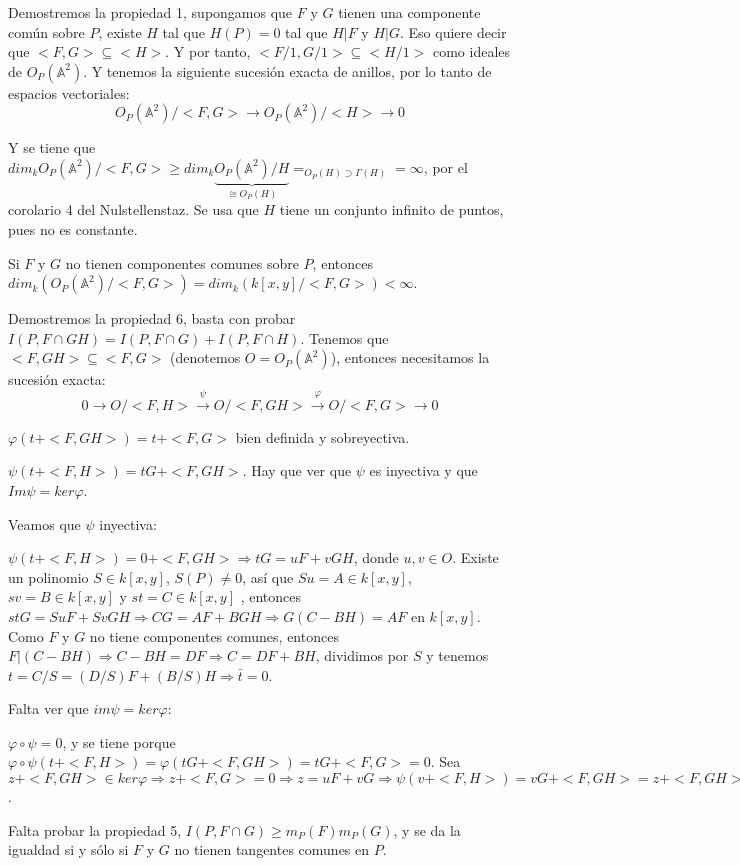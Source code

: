 \begin{Dem}
Demostremos la propiedad 1, supongamos que $F$ y $G$ tienen una componente común sobre $P$, existe $H$ tal que $H(P)=0$ tal que $H|F$ y $H|G$. Eso quiere decir que $<F,G>\subseteq <H>$. Y por tanto, $<F/1,G/1> \subseteq <H/1>$ como ideales de $O_P(\mathbb{A}^2)$. Y tenemos la siguiente sucesión exacta de anillos, por lo tanto de espacios vectoriales:
$$O_P(\mathbb{A}^2)/<F,G> \rightarrow O_P(\mathbb{A}^2)/<H> \rightarrow 0 $$

Y se tiene que $dim_k O_P(\mathbb{A}^2)/<F,G> \ge dim_k \underbrace{O_P(\mathbb {A}^2)/H}_{\cong O_P(H)}=_{O_P(H)\supset \Gamma(H)}=\infty$, por el corolario 4 del Nulstellenstaz. Se usa que $H$ tiene un conjunto infinito de puntos, pues no es constante. 

Si $F$ y $G$ no tienen componentes comunes sobre $P$, entonces $dim_k (O_P(\mathbb{A}^2)/<F,G>)=dim_k (k[x,y]/<F,G>)<\infty $. 

Demostremos la propiedad 6, basta con probar $I(P,F\cap GH) =I(P,F\cap G)+I(P,F\cap H)$. Tenemos que $<F,GH>\subseteq <F,G>$ (denotemos $O=O_P(\mathbb{A}^2)$), entonces necesitamos la sucesión exacta:
$$ 0 \rightarrow O/<F,H>\xrightarrow{\psi} O/<F,GH> \xrightarrow{\varphi} O/<F,G> \rightarrow 0 $$

$\varphi(t+<F,GH>)=t+<F,G>$ bien definida y sobreyectiva.

$\psi(t+<F,H>) = tG+ <F,GH>$. Hay que ver que $\psi$ es inyectiva y que $Im \psi = ker \varphi$. 

Veamos que $\psi$ inyectiva:

$\psi(t+<F,H>)=0+<F,GH> \Rightarrow tG= uF+vGH$, donde $u,v\in O$. Existe un polinomio $S\in k[x,y]$, $S(P)\neq 0$, así que $Su=A\in k[x,y]$, $sv=B\in k[x,y]$ y $st=C \in k[x,y]$ , entonces $stG=SuF+SvGH \Rightarrow CG=AF+BGH \Rightarrow G(C-BH)=AF$ en $k[x,y]$. Como $F$ y $G$ no tiene componentes comunes, entonces $F|(C-BH) \Rightarrow C-BH=DF \Rightarrow C=DF+BH$, dividimos por $S$ y tenemos $t = C/S = (D/S)F+(B/S)H  \Rightarrow \bar{t}=0$. 

Falta ver que $im \psi = ker \varphi$:

\framebox{$\subseteq$} $\varphi \circ \psi = 0$, y se tiene porque $\varphi \circ \psi (t+<F,H>) = \varphi(tG+<F,GH>)=tG+<F,G>=0$. \framebox{$\supseteq $} Sea $z+<F,GH>\in ker \varphi \Rightarrow z+<F,G> = 0 \Rightarrow z = uF +vG \Rightarrow \psi(v+<F,H>) = vG+<F,GH> = z+<F,GH>$. 

Falta probar la propiedad 5, $I(P,F\cap G)\ge m_P(F)m_P(G)$, y se da la igualdad si y sólo si $F$ y $G$ no tienen tangentes comunes en $P$. 


\end{Dem}
